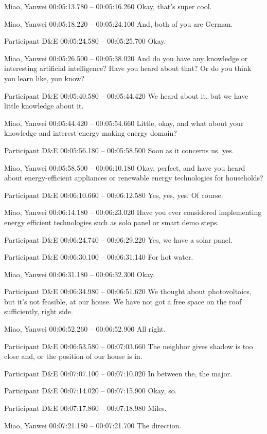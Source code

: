 {Miao, Yanwei 00:05:13.780 -- 00:05:16.260
Okay, that's super cool.

Miao, Yanwei 00:05:18.220 -- 00:05:24.100
And, both of you are German.

Participant D\&E 00:05:24.580 -- 00:05:25.700
Okay.

Miao, Yanwei 00:05:26.500 -- 00:05:38.020
And do you have any knowledge or interesting artificial intelligence? Have you heard about that? Or do you think you learn like, you know?

Participant D\&E 00:05:40.580 -- 00:05:44.420
We heard about it, but we have little knowledge about it.

Miao, Yanwei 00:05:44.420 -- 00:05:54.660
Little, okay, and what about your knowledge and interest energy making energy domain?

Participant D\&E 00:05:56.180 -- 00:05:58.500
Soon as it concerns us. yes.

Miao, Yanwei 00:05:58.500 -- 00:06:10.180
Okay, perfect, and have you heard about energy-efficient appliances or renewable energy technologies for households?

Participant D\&E 00:06:10.660 -- 00:06:12.580
Yes, yes, yes. Of course.

Miao, Yanwei 00:06:14.180 -- 00:06:23.020
Have you ever considered implementing energy efficient technologies such as solo panel or smart demo steps.

Participant D\&E 00:06:24.740 -- 00:06:29.220
Yes, we have a solar panel.

Participant D\&E 00:06:30.100 -- 00:06:31.140
For hot water.

Miao, Yanwei 00:06:31.180 -- 00:06:32.300
Okay.

Participant D\&E 00:06:34.980 -- 00:06:51.620
We thought about photovoltaics, but it's not feasible, at our house. We have not got a free space on the roof sufficiently, right side.

Miao, Yanwei 00:06:52.260 -- 00:06:52.900
All right.

Participant D\&E 00:06:53.580 -- 00:07:03.660
The neighbor gives shadow is too close and, or the position of our house is in.

Participant D\&E 00:07:07.100 -- 00:07:10.020
In between the, the major.

Participant D\&E 00:07:14.020 -- 00:07:15.900
Okay, so.

Participant D\&E 00:07:17.860 -- 00:07:18.980
Miles.

Miao, Yanwei 00:07:21.180 -- 00:07:21.700
The direction.

}
